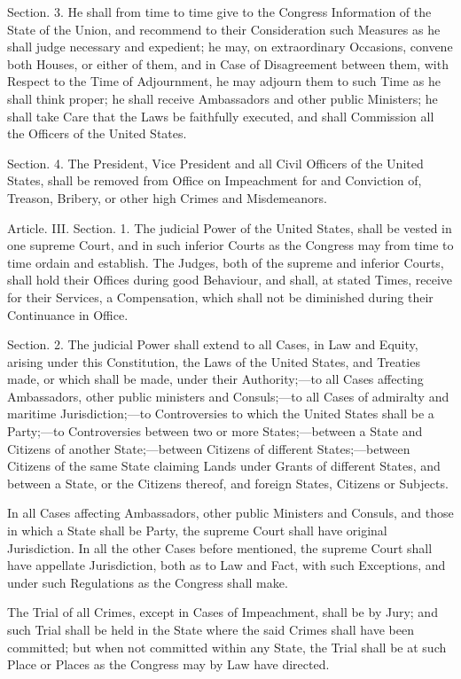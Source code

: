 \documentclass{article}
\begin{document}
Section. 3.  He shall from time to time give to the Congress Information
of the State of the Union, and recommend to their Consideration such
Measures as he shall judge necessary and expedient; he may, on
extraordinary Occasions, convene both Houses, or either of them, and in
Case of Disagreement between them, with Respect to the Time of
Adjournment, he may adjourn them to such Time as he shall think proper;
he shall receive Ambassadors and other public Ministers; he shall take
Care that the Laws be faithfully executed, and shall Commission all the
Officers of the United States.

Section. 4.  The President, Vice President and all Civil Officers of the
United States, shall be removed from Office on Impeachment for and
Conviction of, Treason, Bribery, or other high Crimes and Misdemeanors.

Article. III.  Section. 1.  The judicial Power of the United States,
shall be vested in one supreme Court, and in such inferior Courts as the
Congress may from time to time ordain and establish. The Judges, both of
the supreme and inferior Courts, shall hold their Offices during good
Behaviour, and shall, at stated Times, receive for their Services, a
Compensation, which shall not be diminished during their Continuance in
Office.

Section. 2.  The judicial Power shall extend to all Cases, in Law and
Equity, arising under this Constitution, the Laws of the United States,
and Treaties made, or which shall be made, under their Authority;—to all
Cases affecting Ambassadors, other public ministers and Consuls;—to all
Cases of admiralty and maritime Jurisdiction;—to Controversies to which
the United States shall be a Party;—to Controversies between two or more
States;—between a State and Citizens of another State;—between Citizens
of different States;—between Citizens of the same State claiming Lands
under Grants of different States, and between a State, or the Citizens
thereof, and foreign States, Citizens or Subjects.

In all Cases affecting Ambassadors, other public Ministers and Consuls,
and those in which a State shall be Party, the supreme Court shall have
original Jurisdiction. In all the other Cases before mentioned, the
supreme Court shall have appellate Jurisdiction, both as to Law and
Fact, with such Exceptions, and under such Regulations as the Congress
shall make.

The Trial of all Crimes, except in Cases of Impeachment, shall be by
Jury; and such Trial shall be held in the State where the said Crimes
shall have been committed; but when not committed within any State, the
Trial shall be at such Place or Places as the Congress may by Law have
directed.
\end{document}
